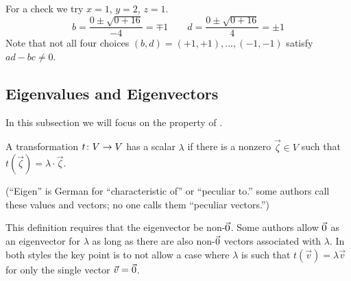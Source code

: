 \begin{exercises}
\begin{answer}
\begin{exparts}
        For a check we try \( x=1 \), \( y=2 \), \( z=1 \).
        \begin{equation*}
           b=\frac{0\pm\sqrt{0+16} }{-4}=\mp 1
           \qquad
           d=\frac{0\pm\sqrt{0+16} }{4}=\pm 1
        \end{equation*}
        Note that not all four choices \( (b,d)=(+1,+1),\dots,(-1,-1) \)
        satisfy \( ad-bc\neq 0 \).
      \end{exparts} 
    \end{answer}
\end{exercises}































\subsection{Eigenvalues and Eigenvectors}
In this subsection we will focus on the
property of .

\begin{definition} \label{def:Eigen}
A transformation \( \mbox{$t\colon V\to V$} \) has a scalar
%
\( \lambda \)
if there is a nonzero  \( \vec{\zeta}\in V \)
such that
$
  t(\vec{\zeta})=\lambda\cdot\vec{\zeta}
$.
\end{definition}

\noindent (``Eigen'' is German for ``characteristic of'' or ``peculiar to.'' 
some authors call these %
 values and vectors;
no one calls them ``peculiar vectors.'')

\begin{remark}
This definition requires that the eigenvector be non-$\vec{0}$.
Some authors allow $\vec{0}$ as
an eigenvector for $\lambda$ as long as there are also
non-$\vec{0}$ vectors associated with $\lambda$.
In both styles the key point is 
to not allow a case where $\lambda$ is such that
$t(\vec{v})=\lambda\vec{v}$ for only the single vector $\vec{v}=\vec{0}$.  
\end{remark}

